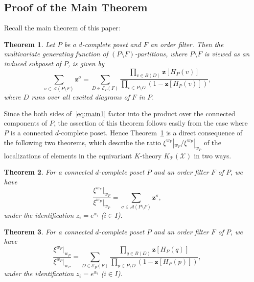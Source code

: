 \documentclass[10pt]{amsart}
\newtheorem{theo}{Theorem}[section]
\theoremstyle{definition}
\theoremstyle{remark}
\newcommand\vectz{\boldsymbol{z}}
\newcommand\AP{\mathcal{A}}
\newcommand\EE{\mathcal{E}}
\newcommand\TT{\mathcal{T}}
\newcommand\XX{\mathcal{X}}
\begin{document}
\subsection{
Proof of the Main Theorem
}

Recall the main theorem of this paper:

\begin{theo}
\label{thm:main1}
Let $P$ be a $d$-complete poset and $F$ an order filter.
Then the multivariate generating function of $(P \setminus F)$-partitions, 
where $P \setminus F$ is viewed as an induced subposet of $P$, is given by
\begin{equation}
\label{eq:main1}
\sum_{\sigma \in \AP(P \setminus F)} \vectz^\sigma
 =
\sum_{D \in \EE_P(F)}
 \frac{ \prod_{v \in B(D)} \vectz[H_P(v)] }
 { \prod_{v \in P \setminus D} ( 1 - \vectz[H_P(v)] ) },
\end{equation}
where $D$ runs over all excited diagrams of $F$ in $P$.
\end{theo}

Since the both sides of~\eqref{eq:main1} factor into the product over the connected components of $P$, 
the assertion of this theorem follows easily from the case where $P$ is a connected $d$-complete poset.
Hence Theorem~\ref{thm:main1} is a direct consequence of the following two theorems, 
which describe the ratio $\xi^{w_F}|_{w_P} \big/ \xi^{w_P}|_{w_P}$ of the localizations of elements 
in the equivariant $K$-theory $K_\TT(\XX)$ in two ways.

\begin{theo}
\label{thm:xi1}
For a connected $d$-complete poset $P$ and an order filter $F$ of $P$, we have
\begin{equation}
\label{eq:xi1}
\frac{ \xi^{w_F}|_{w_P} }
 { \xi^{w_P}|_{w_P} }
 =
\sum_{\sigma \in \AP(P \setminus F)} \vectz^\sigma,
\end{equation}
under the identification $z_i = e^{\alpha_i}$ \textup{(}$i \in I$\textup{)}.
\end{theo}

\begin{theo}
\label{thm:xi2}
For a connected $d$-complete poset $P$ and an order filter $F$ of $P$, we have
\begin{equation}
\label{eq:xi2}
\frac{ \xi^{w_F}|_{w_P} }
 { \xi^{w_P}|_{w_P} }
 =
\sum_{D \in \EE_P(F)}
 \frac{ \prod_{q \in B(D)} \vectz[H_P(q)] }
 { \prod_{p \in P \setminus D} (1 - \vectz[H_P(p)]) },
\end{equation}
under the identification $z_i = e^{\alpha_i}$ \textup{(}$i \in I$\textup{)}.
\end{theo}
\end{document}
